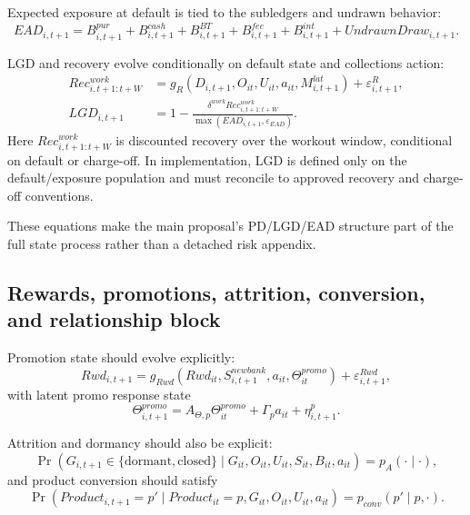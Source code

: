 \documentclass[11pt]{article}
\newcommand{\1}{\mathbf{1}}
\theoremstyle{definition}
\begin{document}
Expected exposure at default is tied to the subledgers and undrawn behavior:
\begin{equation}
  EAD_{i,t+1}
  =
  B_{i,t+1}^{pur}+B_{i,t+1}^{cash}+B_{i,t+1}^{BT}+B_{i,t+1}^{fee}+B_{i,t+1}^{int}
  + UndrawnDraw_{i,t+1}.
  \label{eq:ead-identity}
\end{equation}

LGD and recovery evolve conditionally on default state and collections action:
\begin{align}
  Rec^{work}_{i,t+1:t+W}
  &= g_R(D_{i,t+1},O_{it},U_{it},a_{it},M^{lat}_{i,t+1})
     + \varepsilon^R_{i,t+1},
    \label{eq:recovery-process}\\
  LGD_{i,t+1}
  &=
  1-\frac{\delta^{work}Rec^{work}_{i,t+1:t+W}}
          {\max(EAD_{i,t+1},\varepsilon_{EAD})}.
  \label{eq:lgd-identity}
\end{align}
Here $Rec^{work}_{i,t+1:t+W}$ is discounted recovery over the workout window,
conditional on default or charge-off. In implementation, LGD is defined only on
the default/exposure population and must reconcile to approved recovery and
charge-off conventions.

These equations make the main proposal's PD/LGD/EAD structure part of the full
state process rather than a detached risk appendix.

\subsection{Rewards, promotions, attrition, conversion, and relationship block}

Promotion state should evolve explicitly:
\begin{equation}
  Rwd_{i,t+1}
  =
  g_{Rwd}(Rwd_{it},S^{newbank}_{i,t+1},a_{it},\Theta^{promo}_{it})
  + \varepsilon^{Rwd}_{i,t+1},
  \label{eq:promo-transition}
\end{equation}
with latent promo response state
\begin{equation}
  \Theta^{promo}_{i,t+1}
  =
  A_{\Theta,p}\Theta^{promo}_{it} + \Gamma_p a_{it} + \eta^p_{i,t+1}.
  \label{eq:promo-latent-transition}
\end{equation}

Attrition and dormancy should also be explicit:
\begin{equation}
  \Pr(G_{i,t+1}\in\{\mathrm{dormant},\mathrm{closed}\}
    \mid G_{it},O_{it},U_{it},S_{it},B_{it},a_{it})
  = p_A(\cdot\mid\cdot),
  \label{eq:attrition-transition}
\end{equation}
and product conversion should satisfy
\begin{equation}
  \Pr(Product_{i,t+1}=p'\mid Product_{it}=p,G_{it},O_{it},U_{it},a_{it})
  = p_{conv}(p'\mid p,\cdot).
  \label{eq:conversion-transition}
\end{equation}
\end{document}
